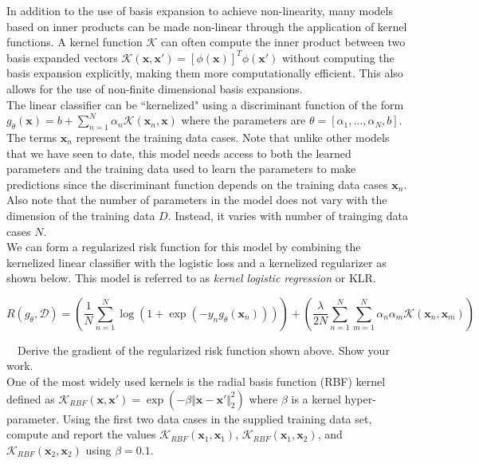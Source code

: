 \documentclass[11pt]{article}
\newcommand{\mbf}[1]{{\mathbf{#1}}}
\begin{document}
\begin{problem}{20} In addition to the use of basis expansion to achieve non-linearity, many models based on inner products can be made non-linear through the application of kernel functions. A kernel function  $\mathcal{K}$ can often compute the inner product between two basis expanded vectors
 $\mathcal{K}(\mbf{x},\mbf{x}')=  [\phi(\mbf{x})]^T\phi(\mbf{x}')$ without computing the basis expansion explicitly, making them more computationally efficient. This also allows for the use of non-finite dimensional basis expansions.\\

The linear classifier can be ``kernelized" using a   
discriminant function of the form $g_{\theta}(\mbf{x})=b+\sum_{n=1}^N \alpha_n \mathcal{K}(\mbf{x}_n,\mbf{x})$ where the parameters are $\theta=[\alpha_1,...,\alpha_N,b]$. The terms $\mbf{x}_n$ represent the training data cases. Note that unlike other models that we have seen to date, this model needs access to both the learned parameters and the training data used to learn the parameters to make predictions since the discriminant function depends on the training data cases $\mbf{x}_n$. Also note that the number of parameters in the model does not vary with the dimension of the training data $D$. Instead, it varies with number of trainging data cases $N$.\\

We can form a regularized risk function for this model by combining the kernelized linear classifier with the logistic loss and a kernelized regularizer as shown below. This model is referred to as \textit{kernel logistic regression} or KLR.

$$R(g_{\theta},\mathcal{D}) = \left(\frac{1}{N}\sum_{n=1}^N \log\left(1+\exp(-y_ng_{\theta}(\mbf{x}_n))\right) \right)
+\left(\frac{\lambda}{2N}\sum_{n=1}^N\sum_{m=1}^N\alpha_n\alpha_m \mathcal{K}(\mbf{x}_n,\mbf{x}_m)\right)$$
\vspace{0.5em}

 ~~Derive the gradient of the regularized risk function shown above. Show your work.\\

 One of the most widely used kernels is the radial basis function (RBF) kernel defined as $\mathcal{K}_{RBF}(\mbf{x},\mbf{x}') = \exp(-\beta\Vert \mbf{x}-\mbf{x}'\Vert^2_2)$ where $\beta$ is a kernel hyper-parameter.
Using the first two data cases in the supplied training data set, compute and report the values $\mathcal{K}_{RBF}(\mbf{x}_1,\mbf{x}_1)$, $\mathcal{K}_{RBF}(\mbf{x}_1,\mbf{x}_2)$, and $\mathcal{K}_{RBF}(\mbf{x}_2,\mbf{x}_2)$ using $\beta=0.1$.\\


\end{problem}
\end{document}
